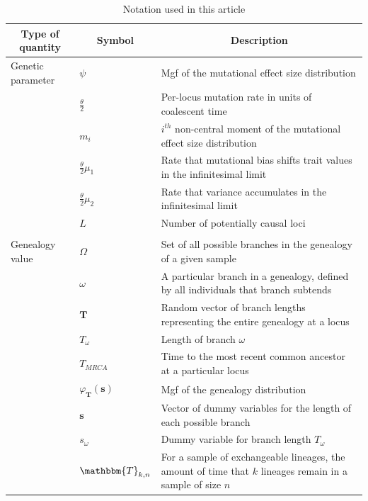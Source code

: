 \begin{table}
  \caption{Notation used in this article}
  \centering
  \begin{tabular}{l l l}
    \hline
    \multicolumn{1}{c}{Type of quantity} &\multicolumn{1}{c}{Symbol} & \multicolumn{1}{c}{Description} \\
    \hline
    Genetic parameter & $\psi$ & \multicolumn{1}{p{10cm}}{Mgf of the mutational effect size distribution }\\
    & $\frac{\theta}{2}$ & \multicolumn{1}{p{10cm}}{Per-locus mutation rate in units of coalescent time}\\
    & $m_i$ &  \multicolumn{1}{p{10cm}}{$i^{th}$ non-central moment of the mutational effect size distribution}\\
    & $\frac{\theta}{2}\mu_1$ & \multicolumn{1}{p{10cm}}{Rate that mutational bias shifts trait values in the infinitesimal limit}\\
    & $\frac{\theta}{2}\mu_2$ & \multicolumn{1}{p{10cm}}{Rate that variance accumulates in the infinitesimal limit}\\
    & $L$ & \multicolumn{1}{p{10cm}}{Number of potentially causal loci}\\
    & & \\
    Genealogy value &  $\Omega$ & \multicolumn{1}{p{10cm}}{Set of all possible branches in the genealogy of a given sample}\\
    & $\omega$ & \multicolumn{1}{p{10cm}}{A particular branch in a genealogy, defined by all individuals that branch subtends}\\
    & $\mathbf{T}$ & \multicolumn{1}{p{10cm}}{Random vector of branch lengths representing the entire genealogy at a locus}\\
    & $T_\omega$ & \multicolumn{1}{p{10cm}}{Length of branch $\omega$} \\
    & $T_{MRCA}$ & \multicolumn{1}{p{10cm}}{Time to the most recent common ancestor at a particular locus}\\
    & $\varphi_{\mathbf{T}}(\mathbf{s})$ & Mgf of the genealogy distribution \\
    & $\mathbf{s}$ & Vector of dummy variables for the length of each possible branch\\
    & $s_\omega$ & Dummy variable for branch length $T_{\omega}$ \\
    & $\mathbbm{T}_{k,n}$ & \multicolumn{1}{p{10cm}}{For a sample of exchangeable lineages, the amount of time that $k$ lineages remain in a sample of size $n$}\\

\end{tabular}
\end{table}
